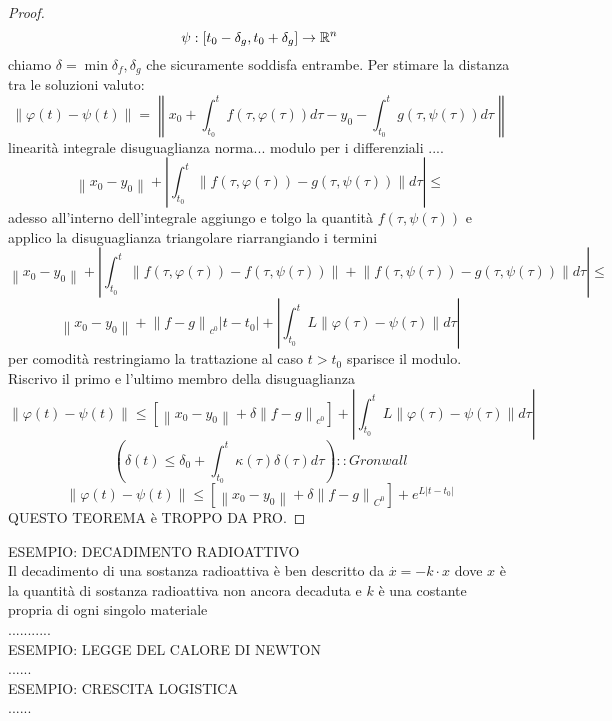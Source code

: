 \begin{proof}
	$$\psi:\left[t_0-\delta_g,t_0+\delta_g\right]\to \mathbb{R}^n$$
	chiamo $\delta=\min{\delta_f,\delta_g}$ che sicuramente soddisfa entrambe. Per stimare la distanza tra le soluzioni valuto:
	$$
	\left\|\varphi(t)-\psi(t)\right\|=
	\left\|  x_0+\int_{t_0}^t f(\tau,\varphi(\tau))d\tau - y_0 - \int_{t_0}^t g(\tau,\psi(\tau))d\tau\right\|
	$$
	linearità integrale disuguaglianza norma... modulo per i differenziali ....\\
	$$ \left\| x_0-y_0\right\|+\left| \int_{t_0}^{t} \left\| f(\tau,\varphi(\tau))-g(\tau,\psi(\tau)) \right\|d\tau \right|\le$$
	adesso all'interno dell'integrale aggiungo e tolgo la quantità $f(\tau,\psi(\tau))$ e applico la disuguaglianza triangolare riarrangiando i termini
	$$ \left\| x_0-y_0\right\|+\left| \int_{t_0}^{t} \left\| f(\tau,\varphi(\tau))-f(\tau,\psi(\tau))\right\|+\left\|f(\tau,\psi(\tau))-g(\tau,\psi(\tau)) \right\|d\tau \right|\le$$
	$$ \left\| x_0-y_0\right\| + \left\| f-g\right\|_{c^0}\left|t-t_0\right| +\left| \int_{t_0}^{t} L\left\|\varphi(\tau)-\psi(\tau)\right\| d\tau \right|$$
	per comodità restringiamo la trattazione al caso $t>t_0$ sparisce il modulo. Riscrivo il primo e l'ultimo membro della disuguaglianza
	$$ \left\|\varphi(t)-\psi(t)\right\|\le  \left[ \left\| x_0-y_0\right\| + \delta\left\| f-g\right\|_{c^0}\right] +\left| \int_{t_0}^{t} L\left\|\varphi(\tau)-\psi(\tau)\right\| d\tau \right|$$
	$$ \left( \delta(t)\le\delta_0+\int_{t_0}^t \kappa(\tau)\delta(\tau)d\tau \right)::Gronwall$$
	$$ \left\| \varphi(t)-\psi(t)\right\|\le\left[\left\|x_0-y_0\right\|+\delta\left\|f-g\right\|_{C^0}\right]+e^{L\left|t-t_0\right|}$$
	QUESTO TEOREMA è TROPPO DA PRO.
\end{proof}
ESEMPIO: DECADIMENTO RADIOATTIVO\\
Il decadimento di una sostanza radioattiva è ben descritto da $\overset{\cdot}{x}=-k\cdot x$ dove $x$ è la quantità di sostanza radioattiva non ancora decaduta e $k$ è una costante propria di ogni singolo materiale\\
...........\\
ESEMPIO: LEGGE DEL CALORE DI NEWTON\\
......\\
ESEMPIO: CRESCITA LOGISTICA\\
......\\
